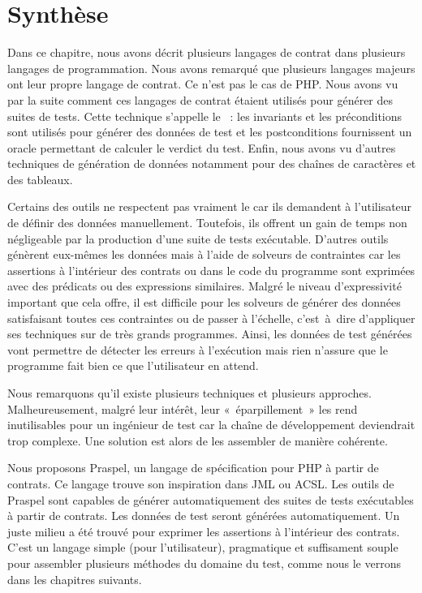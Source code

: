 \section{Synthèse}
\label{section:sota:summary}

Dans ce chapitre, nous avons décrit plusieurs langages de contrat dans plusieurs
langages de programmation. Nous avons remarqué que plusieurs langages majeurs
ont leur propre langage de contrat. Ce n'est pas le cas de PHP. Nous avons vu
par la suite comment ces langages de contrat étaient utilisés pour générer des
suites de tests. Cette technique s'appelle le ~: les invariants et les préconditions sont utilisés pour générer des
données de test et les postconditions fournissent un oracle permettant de
calculer le verdict du test. Enfin, nous avons vu d'autres techniques de
génération de données notamment pour des chaînes de caractères et des tableaux.

Certains des outils ne respectent pas vraiment le  car ils demandent à l'utilisateur de définir des données manuellement.
Toutefois, ils offrent un gain de temps non négligeable par la production d'une
suite de tests exécutable. D'autres outils génèrent eux-mêmes les données mais à
l'aide de solveurs de contraintes car les assertions à l'intérieur des contrats
ou dans le code du programme sont exprimées avec des prédicats ou des
expressions similaires. Malgré le niveau d'expressivité important que cela
offre, il est difficile pour les solveurs de générer des données satisfaisant
toutes ces contraintes ou de passer à l'échelle, c'est~à~dire d'appliquer ses
techniques sur de très grands programmes. Ainsi, les données de test générées
vont permettre de détecter les erreurs à l'exécution mais rien n'assure que le
programme fait bien ce que l'utilisateur en attend.

Nous remarquons qu'il existe plusieurs techniques et plusieurs approches.
Malheureusement, malgré leur intérêt, leur «~éparpillement~» les rend
inutilisables pour un ingénieur de test car la chaîne de développement
deviendrait trop complexe. Une solution est alors de les assembler de manière
cohérente.

Nous proposons Praspel, un langage de spécification pour PHP à partir de
contrats. Ce langage trouve son inspiration dans JML ou ACSL. Les outils de
Praspel sont capables de générer automatiquement des suites de tests exécutables
à partir de contrats. Les données de test seront générées automatiquement. Un
juste milieu a été trouvé pour exprimer les assertions à l'intérieur des
contrats. C'est un langage simple (pour l'utilisateur), pragmatique et
suffisament souple pour assembler plusieurs méthodes du domaine du test, comme
nous le verrons dans les chapitres suivants.
